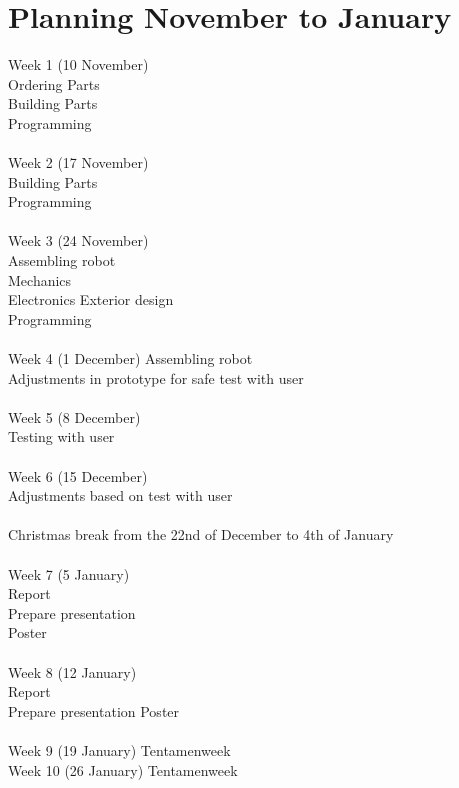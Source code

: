 \documentclass[11pt,twoside,a4paper]{report}
\begin{document}
\chapter{Planning November to January}
Week 1 (10 November)\\
Ordering Parts\\
Building Parts\\
Programming\\
\\
Week 2 (17 November)\\
Building Parts\\
Programming\\
\\
Week 3 (24 November)\\
Assembling robot\\
	Mechanics\\
	Electronics
	Exterior design\\
	Programming\\
\\
Week 4 (1 December)
Assembling robot\\
Adjustments in prototype for safe test with user\\
\\
Week 5 (8 December)\\
Testing with user\\
\\
Week 6 (15 December)\\
Adjustments based on test with user\\
\\
Christmas break from the 22nd of December to 4th of January\\
\\
Week 7 (5 January)\\
Report\\
Prepare presentation\\
Poster\\
\\
Week 8 (12 January)\\
Report\\
Prepare presentation
Poster\\
\\
Week 9 (19 January) Tentamenweek\\
Week 10 (26 January) Tentamenweek
\end{document}
